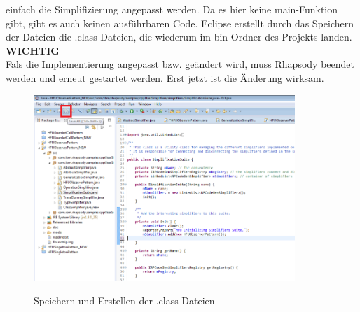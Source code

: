 einfach die Simplifizierung angepasst werden. Da es hier keine main-Funktion
gibt, gibt es auch keinen ausführbaren Code. Eclipse erstellt durch das
Speichern der Dateien die .class Dateien, die wiederum im bin Ordner des
Projekts landen.\\ 
\textbf{WICHTIG}\\
Fals die Implementierung angepasst bzw. geändert wird, muss
Rhapsody beendet werden und erneut gestartet werden. Erst jetzt ist die Änderung
wirksam.  
\begin{figure}[H]
	\centering
	\includegraphics[width=0.88\textwidth]{content/pictures/install/saveBin.png}
	\label{pic:bild}
	\caption{Speichern und Erstellen der .class Dateien}
\end{figure} 




